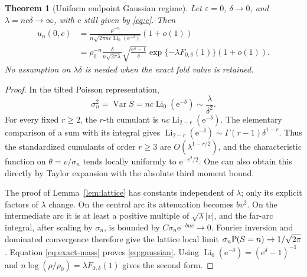 \documentclass[11pt,a4paper]{article}
\numberwithin{equation}{section}
\newtheorem{theorem}{Theorem}[section]
\theoremstyle{definition}
\theoremstyle{remark}
\DeclareMathOperator{\Li}{Li}
\DeclareMathOperator{\Var}{Var}
\newcommand{\ep}{\varepsilon}\newcommand{\la}{\lambda}
\newcommand{\rhob}{\rho_0}\newcommand{\ee}{\mathrm e}
\begin{document}
\begin{theorem}[Uniform endpoint Gaussian regime]\label{thm:gaussian}
Let \(\ep=0\), \(\delta\to0\), and \(\la=nc\delta\to\infty\), with
\(c\) still given by \eqref{eq:c}. Then
\begin{align}
 u_n(0,c)
 &=\frac{\rho^{-n}}{n\sqrt{2\pi nc\Li_0(\ee^{-\delta})}}(1+o(1))
 \label{eq:gaussian}\\
 &=\rhob^{-n}\frac\delta{n\sqrt{2\pi\la}}
   \sqrt{\frac{\ee^\delta-1}{\delta}}
   \exp\{-\la F_{0,\delta}(1)\}(1+o(1)).\label{eq:gaussian-normalized}
\end{align}
No assumption on \(\la\delta\) is needed when the exact fold value is
retained.
\end{theorem}
\begin{proof}
In the tilted Poisson representation,
\[
 \sigma_n^2=\Var S=nc\Li_0(\ee^{-\delta})
                    \sim\frac\la{\delta^2}.
\]
For every fixed \(r\ge2\), the \(r\)-th cumulant is
\(nc\Li_{2-r}(\ee^{-\delta})\). The elementary comparison of a sum with
its integral gives
\(\Li_{2-r}(\ee^{-\delta})\sim\Gamma(r-1)\delta^{1-r}\).
Thus the standardized cumulants of order \(r\ge3\) are
\(O(\la^{1-r/2})\), and the characteristic function on
\(\theta=v/\sigma_n\) tends locally uniformly to \(\ee^{-v^2/2}\).
One can also obtain this directly by Taylor expansion with the absolute
third moment bound.

The proof of Lemma~\ref{lem:lattice} has constants independent of
\(\la\); only its explicit factors of \(\la\) change. On the central
arc its attenuation becomes \(bv^2\). On the intermediate arc it is
at least a positive multiple of \(\sqrt\la|v|\), and the far-arc
integral, after scaling by \(\sigma_n\), is bounded by
\(C\sigma_n\ee^{-bnc}\to0\). Fourier inversion and dominated
convergence therefore give the lattice local limit
\(\sigma_n\mathbb P(S=n)\to1/\sqrt{2\pi}\).
Equation \eqref{eq:exact-mass} proves \eqref{eq:gaussian}.
Using \(\Li_0(\ee^{-\delta})=(\ee^\delta-1)^{-1}\) and
\(n\log(\rho/\rhob)=\la F_{0,\delta}(1)\) gives the second form.
\end{proof}
\end{document}
